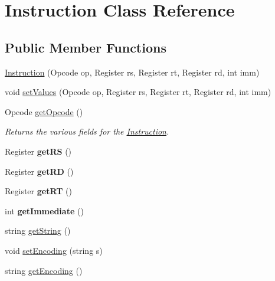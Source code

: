 \hypertarget{class_instruction}{}\section{Instruction Class Reference}
\label{class_instruction}
\subsection*{Public Member Functions}
\begin{DoxyCompactItemize}
\item 
\mbox{\hyperlink{class_instruction_acf9058307d344be3005b10ba1b642ef0}{Instruction}} (Opcode op, Register rs, Register rt, Register rd, int imm)
\item 
void \mbox{\hyperlink{class_instruction_ab7bd4ac378e25f67296e30ab421602f8}{set\+Values}} (Opcode op, Register rs, Register rt, Register rd, int imm)
\item 
\mbox{\label{class_instruction_af934b7598fcb3db6e4493cce118c4eb8}} 
Opcode \mbox{\hyperlink{class_instruction_af934b7598fcb3db6e4493cce118c4eb8}{get\+Opcode}} ()
\begin{DoxyCompactList}\small\item\em Returns the various fields for the \mbox{\hyperlink{class_instruction}{Instruction}}. \end{DoxyCompactList}\item 
\mbox{\label{class_instruction_a1e9448534e3c29339794e59434921375}} 
Register {\bfseries get\+RS} ()
\item 
\mbox{\label{class_instruction_a093410083994dc233c21719b31a05aa2}} 
Register {\bfseries get\+RD} ()
\item 
\mbox{\label{class_instruction_a4e03550d8976160fd678cee3a9a26881}} 
Register {\bfseries get\+RT} ()
\item 
\mbox{\label{class_instruction_a01bb4a1f66f15b1921ba5c9e18320115}} 
int {\bfseries get\+Immediate} ()
\item 
string \mbox{\hyperlink{class_instruction_a3deaa9fb80e0e3e5fbc6b32efaea2f98}{get\+String}} ()
\item 
void \mbox{\hyperlink{class_instruction_ab10e98d595622a19f2ed0c94098692a2}{set\+Encoding}} (string s)
\item 
string \mbox{\hyperlink{class_instruction_a478d5c0c11c0e72b53c73643447e15c3}{get\+Encoding}} ()
\end{DoxyCompactItemize}


